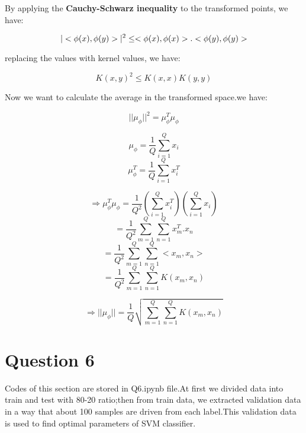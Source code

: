 \documentclass{article}
\begin{document}
By applying the \textbf{Cauchy-Schwarz inequality} to the transformed points, we have:

\begin{equation*}
    |<\phi{(x)}, \phi{(y)}>|^2 \leq \hfil  <\phi{(x)}, \phi{(x)}>.<\phi{(y)}, \phi{(y)}>
\end{equation*}

replacing the values with kernel values, we have:

\begin{equation*}
    K(x, y)^2 \leq K(x, x) K(y, y)
\end{equation*}

Now we want to calculate the average in the transformed space.we have:

\begin{equation*}
    ||\mu_{\phi}||^{2} = \mu_{\phi}^{T}\mu_{\phi}
\end{equation*}

\begin{equation*}
    \mu_{\phi} = \frac{1}{Q} \sum_{i=1}^{Q}x_{i}
\end{equation*}
\begin{equation*}
    \mu_{\phi}^{T} = \frac{1}{Q} \sum_{i=1}^{Q}x_{i}^{T}
\end{equation*}

\begin{equation*}
    \Rightarrow \mu_{\phi}^{T}\mu_{\phi} = \frac{1}{Q^2}(\sum_{i=1}^{Q}x_{i}^{T})(\sum_{i=1}^{Q}x_{i})
\end{equation*}
\begin{equation*}
    = \frac{1}{Q^{2}} \sum_{m=1}^{Q}{\sum_{n=1}^{Q}{x_{m}^{T}.x_{n}}}
\end{equation*}
\begin{equation*}
    = \frac{1}{Q^{2}} \sum_{m=1}^{Q}{\sum_{n=1}^{Q}{<x_{m}, x_{n}}>}
\end{equation*}
\begin{equation*}
    = \frac{1}{Q^{2}} \sum_{m=1}^{Q}{\sum_{n=1}^{Q}{K(x_{m}, x_{n})}}
\end{equation*}

\begin{equation*}
    \Rightarrow ||\mu_{\phi}|| = \frac{1}{Q} \sqrt{ \sum_{m=1}^{Q}{\sum_{n=1}^{Q}{K(x_{m}, x_{n})}}}
\end{equation*}

\section*{Question 6}
Codes of this section are stored in Q6.ipynb file.At first we divided data into train and test with 80-20 ratio;then from train data, we extracted validation data in a way
that about 100 samples are driven from each label.This validation data is used to find optimal parameters of SVM classifier.
\end{document}

